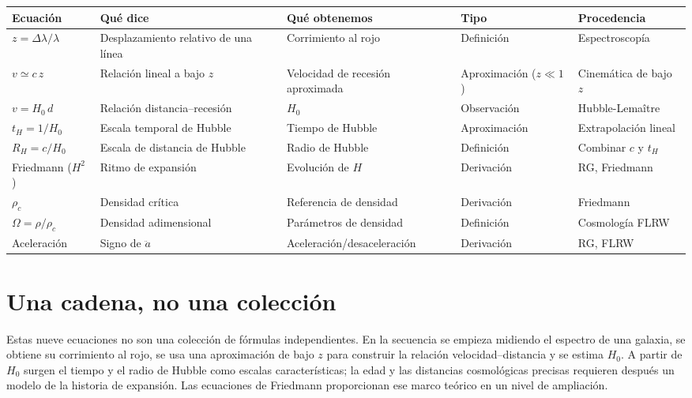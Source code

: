 \begin{tabularx}{\textwidth}{|l|>{\raggedright\arraybackslash}X|>{\raggedright\arraybackslash}X|>{\raggedright\arraybackslash}X|>{\raggedright\arraybackslash}X|}
\hline
\textbf{Ecuación} & \textbf{Qué dice} & \textbf{Qué obtenemos} & \textbf{Tipo} & \textbf{Procedencia} \\ \hline
$z=\Delta\lambda/\lambda$ & Desplazamiento relativo de una línea & Corrimiento al rojo & Definición & Espectroscopía \\ \hline
$v\simeq c\,z$ & Relación lineal a bajo $z$ & Velocidad de recesión aproximada & Aproximación ($z\ll1$) & Cinemática de bajo $z$ \\ \hline
$v=H_0\,d$ & Relación distancia--recesión & $H_0$ & Observación & Hubble-Lemaître \\ \hline
$t_H=1/H_0$ & Escala temporal de Hubble & Tiempo de Hubble & Aproximación & Extrapolación lineal \\ \hline
$R_H=c/H_0$ & Escala de distancia de Hubble & Radio de Hubble & Definición & Combinar $c$ y $t_H$ \\ \hline
Friedmann ($H^2$) & Ritmo de expansión & Evolución de $H$ & Derivación & RG, Friedmann \\ \hline
$\rho_c$ & Densidad crítica & Referencia de densidad & Derivación & Friedmann \\ \hline
$\Omega=\rho/\rho_c$ & Densidad adimensional & Parámetros de densidad & Definición & Cosmología FLRW \\ \hline
Aceleración & Signo de $\ddot a$ & Aceleración/desaceleración & Derivación & RG, FLRW \\ \hline
\end{tabularx}

\section*{Una cadena, no una colección}

Estas nueve ecuaciones no son una colección de fórmulas independientes. En la secuencia se empieza midiendo el espectro de una galaxia, se obtiene su corrimiento al rojo, se usa una aproximación de bajo $z$ para construir la relación velocidad--distancia y se estima $H_0$. A partir de $H_0$ surgen el tiempo y el radio de Hubble como escalas características; la edad y las distancias cosmológicas precisas requieren después un modelo de la historia de expansión. Las ecuaciones de Friedmann proporcionan ese marco teórico en un nivel de ampliación.

